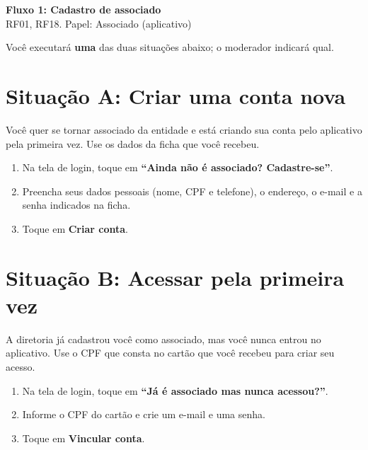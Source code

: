 \documentclass[11pt,a4paper]{article}
\begin{document}
\begin{center}
  {\LARGE\bfseries\color{brandgreen} Fluxo 1: Cadastro de associado}\\[1mm]
  {\large RF01, RF18. Papel: Associado (aplicativo)}
\end{center}

\vspace{2mm}
Você executará \textbf{uma} das duas situações abaixo; o moderador indicará qual.

\section*{Situação A: Criar uma conta nova}

Você quer se tornar associado da entidade e está criando sua conta pelo aplicativo pela primeira
vez. Use os dados da ficha que você recebeu.

\begin{enumerate}[leftmargin=6mm]
  \item Na tela de login, toque em \textbf{``Ainda não é associado? Cadastre-se''}.
  \item Preencha seus dados pessoais (nome, CPF e telefone), o endereço, o e-mail e a senha
    indicados na ficha.
  \item Toque em \textbf{Criar conta}.
\end{enumerate}

\section*{Situação B: Acessar pela primeira vez}

A diretoria já cadastrou você como associado, mas você nunca entrou no aplicativo. Use o CPF que
consta no cartão que você recebeu para criar seu acesso.

\begin{enumerate}[leftmargin=6mm]
  \item Na tela de login, toque em \textbf{``Já é associado mas nunca acessou?''}.
  \item Informe o CPF do cartão e crie um e-mail e uma senha.
  \item Toque em \textbf{Vincular conta}.
\end{enumerate}
\end{document}
